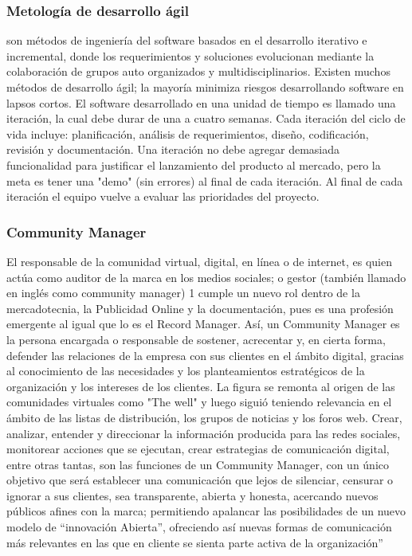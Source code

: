 \subsubsection{Metolog\'ia de desarrollo \'agil } son m\'etodos de ingenier\'ia del software basados en el desarrollo iterativo e incremental, donde los requerimientos y soluciones evolucionan mediante la colaboraci\'on de grupos auto organizados y multidisciplinarios. Existen muchos m\'etodos de desarrollo \'agil; la mayor\'ia minimiza riesgos desarrollando software en lapsos cortos. El software desarrollado en una unidad de tiempo es llamado una iteraci\'on, la cual debe durar de una a cuatro semanas. Cada iteraci\'on del ciclo de vida incluye: planificaci\'on, an\'alisis de requerimientos, dise\~no, codificaci\'on, revisi\'on y documentaci\'on. Una iteraci\'on no debe agregar demasiada funcionalidad para justificar el lanzamiento del producto al mercado, pero la meta es tener una "demo" (sin errores) al final de cada iteraci\'on. Al final de cada iteraci\'on el equipo vuelve a evaluar las prioridades del proyecto.%
\subsubsection{Community Manager}
%
El responsable de la comunidad virtual, digital, en l\'inea o de internet, es quien act\'ua como auditor de la marca en los medios sociales; o gestor (también llamado en inglés como community manager) 1 cumple un nuevo rol dentro de la mercadotecnia, la Publicidad Online y la documentación, pues es una profesión emergente al igual que lo es el Record Manager.
Así, un Community Manager es la persona encargada o responsable de sostener, acrecentar y, en cierta forma, defender las relaciones de la empresa con sus clientes en el ámbito digital, gracias al conocimiento de las necesidades y los planteamientos estratégicos de la organización y los intereses de los clientes. La figura se remonta al origen de las comunidades virtuales como "The well" y luego siguió teniendo relevancia en el ámbito de las listas de distribución, los grupos de noticias y los foros web.
Crear, analizar, entender y direccionar la información producida para las redes sociales, monitorear acciones que se ejecutan, crear estrategias de comunicación digital, entre otras tantas, son las funciones de un Community Manager, con un único objetivo que será establecer una comunicación que lejos de silenciar, censurar o ignorar a sus clientes, sea transparente, abierta y honesta, acercando nuevos públicos afines con la marca; permitiendo apalancar las posibilidades de un nuevo modelo de “innovación Abierta”, ofreciendo así nuevas formas de comunicación más relevantes en las que en cliente se sienta parte activa de la organización”
